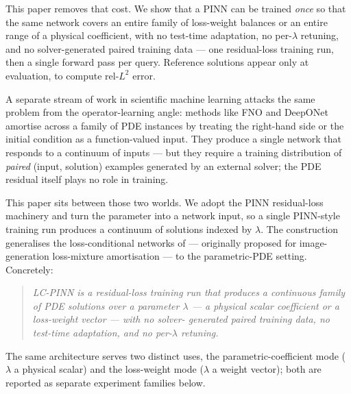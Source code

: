 \documentclass{article}
\theoremstyle{plain}
\theoremstyle{definition}
\theoremstyle{remark}
\begin{document}
This paper removes that cost. We show that a PINN can be trained
\emph{once} so that the same network covers an entire family of
loss-weight balances or an entire range of a physical coefficient,
with no test-time adaptation, no per-$\lambda$ retuning, and no
solver-generated paired training data --- one residual-loss training
run, then a single forward pass per query. Reference solutions
appear only at evaluation, to compute rel-$L^2$ error.

A separate stream of work in scientific machine learning attacks the
same problem from the operator-learning angle: methods like FNO
\citep{li2020fno} and DeepONet \citep{lu2021deeponet} amortise across
a family of PDE instances by treating the right-hand side or the
initial condition as a function-valued input. They produce a single
network that responds to a continuum of inputs --- but they require a
training distribution of \emph{paired} (input, solution) examples
generated by an external solver; the PDE residual itself plays no
role in training.

This paper sits between those two worlds. We adopt the PINN
residual-loss machinery and turn the parameter into a network input,
so a single PINN-style training run produces a continuum of
solutions indexed by $\lambda$. The construction generalises the
loss-conditional networks of \citet{dosovitskiy2020} --- originally
proposed for image-generation loss-mixture amortisation --- to the
parametric-PDE setting. Concretely:

\begin{quote}\itshape
LC-PINN is a residual-loss training run that produces a continuous
family of PDE solutions over a parameter $\lambda$ --- a physical
scalar coefficient or a loss-weight vector --- with no solver-
generated paired training data, no test-time adaptation, and no per-$\lambda$
retuning.
\end{quote}

\noindent The same architecture serves two distinct uses, the
parametric-coefficient mode ($\lambda$ a physical scalar) and the
loss-weight mode ($\lambda$ a weight vector); both are reported as
separate experiment families below.
\end{document}
